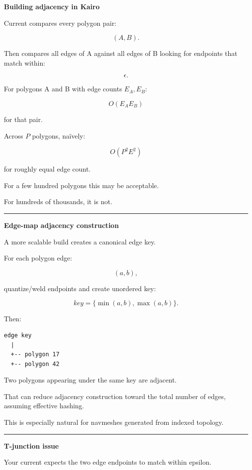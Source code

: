 \textbf{Building adjacency in Kairo}

Current  compares every polygon pair:

\[
(A,B).
\]

Then  compares all edges of A against all edges of B looking for endpoints that match within:

\[
\epsilon.
\]

For polygons A and B with edge counts \(E_A,E_B\):

\[
O(E_AE_B)
\]

for that pair.

Across \(P\) polygons, naïvely:

\[
O(P^2E^2)
\]

for roughly equal edge count.

For a few hundred polygons this may be acceptable.

For hundreds of thousands, it is not.

\begin{center}\rule{0.5\linewidth}{0.5pt}\end{center}

\textbf{Edge-map adjacency construction}

A more scalable build creates a canonical edge key.

For each polygon edge:

\[
(a,b),
\]

quantize/weld endpoints and create unordered key:

\[
key=\{\min(a,b),\max(a,b)\}.
\]

Then:

\begin{verbatim}
edge key
  |
  +-- polygon 17
  +-- polygon 42
\end{verbatim}

Two polygons appearing under the same key are adjacent.

That can reduce adjacency construction toward the total number of edges, assuming effective hashing.

This is especially natural for navmeshes generated from indexed topology.

\begin{center}\rule{0.5\linewidth}{0.5pt}\end{center}

\textbf{T-junction issue}

Your current  expects the two edge endpoints to match within epsilon.

